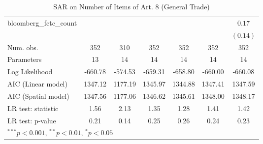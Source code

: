 \begin{table}[!h]
\begin{center}
\begin{tabular}{l c c c c c c }
bloomberg\_fctc\_count  &              &              &              &              &              & $0.17$       \\
                        &              &              &              &              &              & $(0.14)$     \\
\midrule
Num. obs.               & 352          & 310          & 352          & 352          & 352          & 352          \\
Parameters              & 13           & 14           & 14           & 14           & 14           & 14           \\
Log Likelihood          & -660.78      & -574.53      & -659.31      & -658.80      & -660.00      & -660.08      \\
AIC (Linear model)      & 1347.12      & 1177.19      & 1345.97      & 1344.88      & 1347.41      & 1347.59      \\
AIC (Spatial model)     & 1347.56      & 1177.06      & 1346.62      & 1345.61      & 1348.00      & 1348.17      \\
LR test: statistic      & 1.56         & 2.13         & 1.35         & 1.28         & 1.41         & 1.42         \\
LR test: p-value        & 0.21         & 0.14         & 0.25         & 0.26         & 0.24         & 0.23         \\
\bottomrule
\multicolumn{7}{l}{\scriptsize{$^{***}p<0.001$, $^{**}p<0.01$, $^*p<0.05$}}
\end{tabular}
\caption{SAR on Number of Items of Art. 8 (General Trade)}
\label{table:coefficients}
\end{center}
\end{table}
